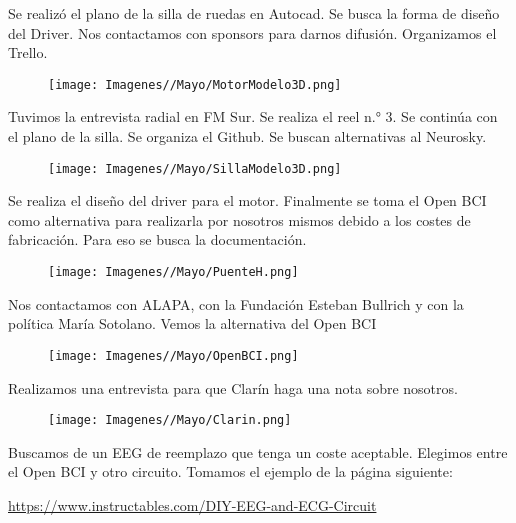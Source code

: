 \documentclass{article}
\begin{document}
Se realizó el plano de la silla de ruedas en Autocad. Se busca la forma de diseño del Driver. Nos contactamos con sponsors para darnos difusión. Organizamos el Trello.

\begin{figure}[H]
    \centering
    \texttt{[image: Imagenes//Mayo/MotorModelo3D.png]}
\end{figure}


\newpage

Tuvimos la entrevista radial en FM Sur. Se realiza el reel n.° 3. Se continúa con el plano de la silla. Se organiza el Github. Se buscan alternativas al Neurosky. 

\begin{figure}[H]
    \centering
    \texttt{[image: Imagenes//Mayo/SillaModelo3D.png]}
\end{figure}

Se realiza el diseño del driver para el motor. Finalmente se toma el Open BCI como alternativa para realizarla por nosotros mismos debido a los costes de fabricación. Para eso se busca la documentación.

\begin{figure}[H]
    \centering
    \texttt{[image: Imagenes//Mayo/PuenteH.png]}
\end{figure}

\newpage

Nos contactamos con ALAPA, con la Fundación Esteban Bullrich y con la política María Sotolano. Vemos la alternativa del Open BCI

\begin{figure}[H]
    \centering
    \texttt{[image: Imagenes//Mayo/OpenBCI.png]}
\end{figure}

Realizamos una entrevista para que Clarín haga una nota sobre nosotros.

\begin{figure}[H]
    \centering
    \texttt{[image: Imagenes//Mayo/Clarin.png]}
\end{figure}




Buscamos de un EEG de reemplazo que tenga un coste aceptable. Elegimos entre el Open BCI y otro circuito. Tomamos el ejemplo de la página siguiente: 

\begin{center}
    \href{https://www.instructables.com/DIY-EEG-and-ECG-Circuit/}{https://www.instructables.com/DIY-EEG-and-ECG-Circuit}
\end{center}
\end{document}
